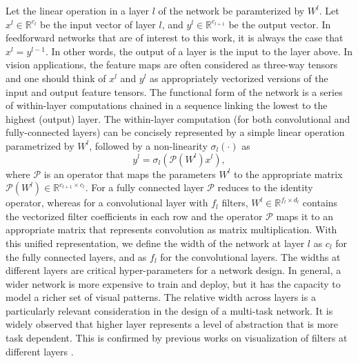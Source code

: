 \documentclass[10pt,twocolumn,letterpaper]{article}
\begin{document}
Let the linear operation in a layer $l$ of the network be paramterized by $W^l$.
Let $x^l \in \mathbb{R}^{c_l}$ be the input vector of layer $l$, and $y^l \in \mathbb{R}^{c_{l+1}}$ be the output vector. In feedforward networks that are of interest to this work, it is always the case that $x^l = y^{l-1}$. In other words, the output of a layer is the input to the layer above. In vision applications, the feature maps are often considered as three-way tensors and one should think of $x^l$ and $y^l$ as  appropriately vectorized versions of the input and output feature tensors. The functional form of the network is a series of within-layer computations chained in a sequence linking the lowest to the highest (output) layer. The within-layer computation (for both convolutional and fully-connected layers) can be concisely represented by a simple linear operation parametrized by $W^l$, followed by a non-linearity $\sigma_l(\cdot)$ as 
\begin{equation}
\label{eqn:within_layer}
y^l = \sigma_l(\mathcal{P}(W^l) x^l),
\end{equation}
\noindent where $\mathcal{P}$ is an operator that maps the parameters $W^l$ to the appropriate matrix $\mathcal{P}(W^l)\in\mathbb{R}^{c_{l+1}\times c_l}$.
For a fully connected layer $\mathcal{P}$ reduces to the identity operator, whereas for a convolutional layer with $f_l$ filters, $W^l\in\mathbb{R}^{f_l\times d_l}$ contains the vectorized filter coefficients in each row and the operator $\mathcal{P}$ maps it to an appropriate matrix that represents convolution as matrix multiplication. 
With this unified representation, we define the width of the network at layer $l$ as $c_l$ for the fully connected layers, and as $f_l$ for the convolutional layers. 
The widths at different layers are critical hyper-parameters for a network design. In general, a wider network is more expensive to train and deploy, but it has the capacity to model a richer set of visual patterns. The relative width across layers is a particularly relevant consideration in the design of a multi-task network. It is widely observed that higher layer represents a level of abstraction that is more task dependent. This is confirmed by previous works on visualization of filters at different layers \cite{zeiler2014visualizing}.  
\end{document}
